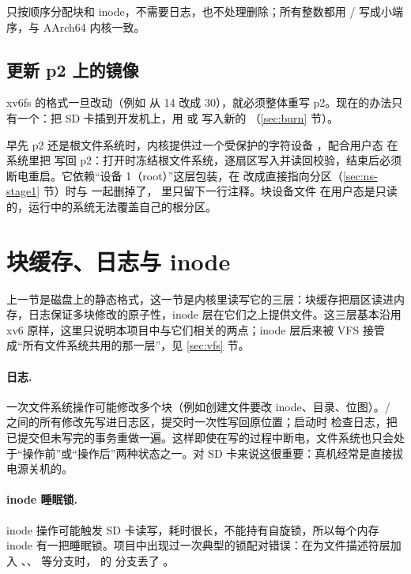  只按顺序分配块和 inode，不需要日志，也不处理删除；所有整数都用 / 写成小端序，与 AArch64 内核一致。

\subsection{更新 p2 上的镜像}

xv6fs 的格式一旦改动（例如  从 14 改成 30），就必须整体重写 p2。现在的办法只有一个：把 SD 卡插到开发机上，用  或  写入新的 （\ref{sec:burn} 节）。

早先 p2 还是根文件系统时，内核提供过一个受保护的字符设备 ，配合用户态  在系统里把  写回 p2：打开时冻结根文件系统，逐扇区写入并读回校验，结束后必须断电重启。它依赖“设备 1（root）”这层包装，在  改成直接指向分区（\ref{sec:ns-stage1} 节）时与  一起删掉了， 里只留下一行注释。块设备文件  在用户态是只读的，运行中的系统无法覆盖自己的根分区。

\section{块缓存、日志与 inode}

上一节是磁盘上的静态格式，这一节是内核里读写它的三层：块缓存把扇区读进内存，日志保证多块修改的原子性，inode 层在它们之上提供文件。这三层基本沿用 xv6 原样，这里只说明本项目中与它们相关的两点；inode 层后来被 VFS 接管成“所有文件系统共用的那一层”，见 \ref{sec:vfs} 节。

\paragraph{日志.} 一次文件系统操作可能修改多个块（例如创建文件要改 inode、目录、位图）。/ 之间的所有修改先写进日志区，提交时一次性写回原位置；启动时  检查日志，把已提交但未写完的事务重做一遍。这样即使在写的过程中断电，文件系统也只会处于“操作前”或“操作后”两种状态之一。对 SD 卡来说这很重要：真机经常是直接拔电源关机的。

\paragraph{inode 睡眠锁.} inode 操作可能触发 SD 卡读写，耗时很长，不能持有自旋锁，所以每个内存 inode 有一把睡眠锁。项目中出现过一次典型的锁配对错误：在为文件描述符层加入 、、 等分支时， 的  分支丢了 。

